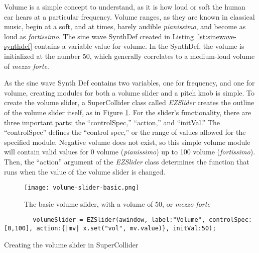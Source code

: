 Volume is a simple concept to understand, as it is how loud or soft the human ear hears at a particular frequency. Volume ranges, as they are known in classical music, begin at a soft, and at times, barely audible \textit{pianissimo}, and become as loud as \textit{fortissimo}. The sine wave SynthDef created in Listing \ref{lst:sinewave-synthdef} contains a variable value for volume. In the SynthDef, the volume is initialized at the number 50, which generally correlates to a medium-loud volume of \textit{mezzo forte}. %

As the sine wave Synth Def contains two variables, one for frequency, and one for volume, creating modules for both a volume slider and a pitch knob is simple. To create the volume slider, a SuperCollider class called \textit{EZSlider} creates the outline of the volume slider itself, as in Figure \ref{fig:volume-slider-basic}. For the slider's functionality, there are three important parts: the ``controlSpec,'' ``action,'' and ``initVal.'' The ``controlSpec'' defines the ``control spec,'' or the range of values allowed for the specified module. Negative volume does not exist, so this simple volume module will contain valid values for 0 volume (\textit{pianissimo}) up to 100 volume (\textit{fortissimo}). Then, the ``action'' argument of the \textit{EZSlider} class determines the function that runs when the value of the volume slider is changed. 

\begin{figure}[h]
  \centering
  \texttt{[image: volume-slider-basic.png]}
  \caption{The basic volume slider, with a volume of 50, or \textit{mezzo forte}}
  \label{fig:volume-slider-basic}
\end{figure}

\begin{listing}
	\begin{lstlisting}
		volumeSlider = EZSlider(awindow, label:"Volume", controlSpec:[0,100], action:{|mv| x.set("vol", mv.value)}, initVal:50);
	\end{lstlisting}
	\caption{Creating the volume slider in SuperCollider}
	\label{lst:volume-slider-waveform}
\end{listing}

